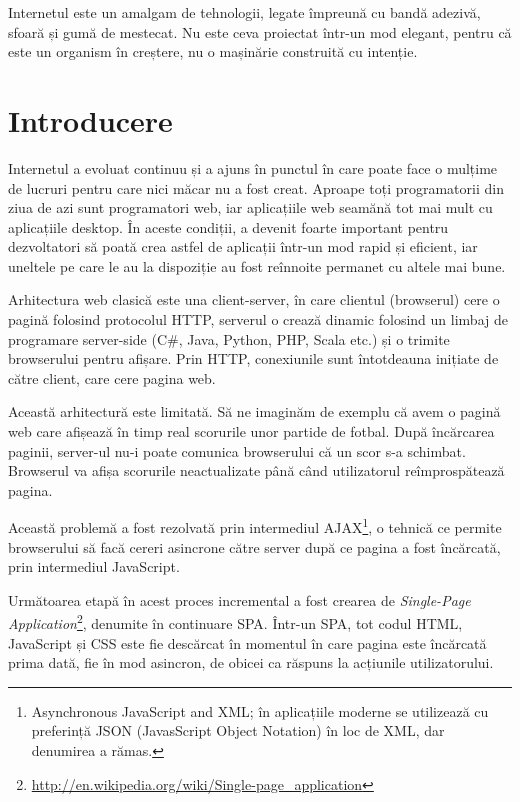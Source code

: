 \begin{savequote}[75mm]
Internetul este un amalgam de tehnologii, legate împreună cu bandă adezivă,
sfoară și gumă de mestecat. Nu este ceva proiectat într-un mod elegant,
pentru că este un organism în creștere, nu o mașinărie construită
cu intenție.
\end{savequote}

\chapter{Introducere}

Internetul a evoluat continuu și a ajuns în punctul în care poate face o mulțime
de lucruri pentru care nici măcar nu a fost creat. Aproape toți programatorii din
ziua de azi sunt programatori web, iar aplicațiile web seamănă tot mai mult cu 
aplicațiile desktop. În aceste condiții, a devenit foarte important pentru
dezvoltatori să poată crea astfel de aplicații într-un mod rapid și eficient, 
iar uneltele pe care le au la dispoziție au fost reînnoite permanet cu altele
mai bune.

Arhitectura web clasică este una client-server, în care clientul (browserul)
cere o pagină folosind protocolul HTTP, serverul o crează dinamic folosind un 
limbaj de programare server-side (C\#, Java, Python, PHP, Scala etc.) și o trimite 
browserului pentru afișare. Prin HTTP, conexiunile sunt întotdeauna inițiate 
de către client, care cere pagina web.

Această arhitectură este limitată. Să ne imaginăm de exemplu că avem o pagină
web care afișează în timp real scorurile unor partide de fotbal. După încărcarea
paginii, server-ul nu-i poate comunica browserului că un scor s-a schimbat.
Browserul va afișa scorurile neactualizate până când utilizatorul reîmprospătează
pagina.

Această problemă a fost rezolvată prin intermediul
AJAX\footnote{Asynchronous JavaScript and XML; în aplicațiile moderne
se utilizează cu preferință JSON (JavasScript Object Notation) în loc de XML,
dar denumirea a rămas.},
o tehnică ce permite browserului să facă cereri asincrone către server după ce 
pagina a fost încărcată, prin intermediul JavaScript.

Următoarea etapă în acest proces incremental a fost crearea de 
\emph{Single-Page Application}\footnote{\url{http://en.wikipedia.org/wiki/Single-page\_application}},
denumite în continuare SPA. Într-un SPA, tot codul HTML, JavaScript și CSS este
fie descărcat în momentul în care pagina este încărcată prima dată, fie în mod asincron, de obicei ca
răspuns la acțiunile utilizatorului.


